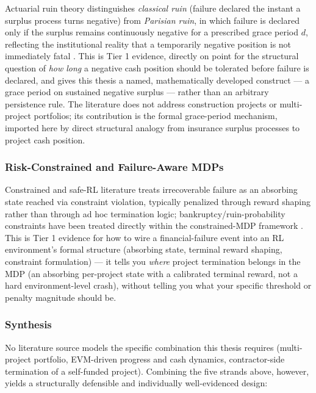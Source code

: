 Actuarial ruin theory distinguishes \emph{classical ruin} (failure declared the instant a surplus process turns negative) from \emph{Parisian ruin}, in which failure is declared only if the surplus remains continuously negative for a prescribed grace period $d$, reflecting the institutional reality that a temporarily negative position is not immediately fatal \cite{dassioswu2008parisian}. This is Tier 1 evidence, directly on point for the structural question of \emph{how long} a negative cash position should be tolerated before failure is declared, and gives this thesis a named, mathematically developed construct — a grace period on sustained negative surplus — rather than an arbitrary persistence rule. The literature does not address construction projects or multi-project portfolios; its contribution is the formal grace-period mechanism, imported here by direct structural analogy from insurance surplus processes to project cash position.

\subsubsection{Risk-Constrained and Failure-Aware MDPs}
\label{subsubsec:lit_constrained_mdp}

Constrained and safe-RL literature treats irrecoverable failure as an absorbing state reached via constraint violation, typically penalized through reward shaping rather than through ad hoc termination logic; bankruptcy/ruin-probability constraints have been treated directly within the constrained-MDP framework \cite{borkarjain2014riskconstrained}. This is Tier 1 evidence for how to wire a financial-failure event into an RL environment's formal structure (absorbing state, terminal reward shaping, constraint formulation) — it tells you \emph{where} project termination belongs in the MDP (an absorbing per-project state with a calibrated terminal reward, not a hard environment-level crash), without telling you what your specific threshold or penalty magnitude should be.

\subsubsection{Synthesis}
\label{subsubsec:lit_synthesis}

No literature source models the specific combination this thesis requires (multi-project portfolio, EVM-driven progress and cash dynamics, contractor-side termination of a self-funded project). Combining the five strands above, however, yields a structurally defensible and individually well-evidenced design:

